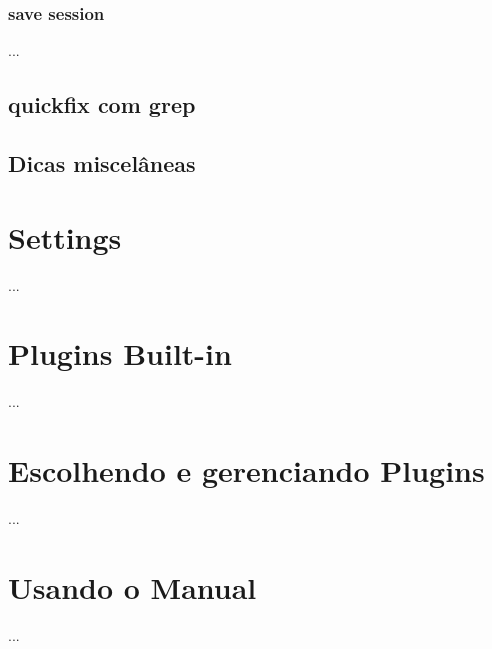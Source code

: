 \documentclass[a4paper, 12pt]{article}
\begin{document}
\subsubsection{save session}
...

\subsection{quickfix com grep}
\subsection{Dicas miscelâneas}

\newpage
\section{Settings}
...

\newpage
\section{Plugins Built-in}
...

\newpage
\section{Escolhendo e gerenciando Plugins}
...

\newpage
\section{Usando o Manual}
...
\newpage
\end{document}
